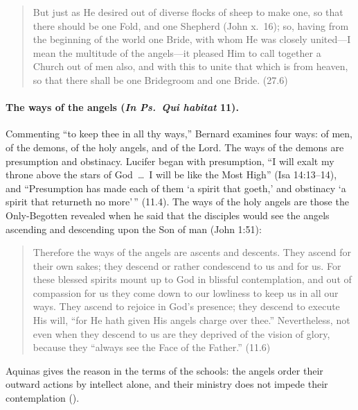 \begin{quote}
But just as He desired out of diverse flocks of sheep to make one, so that
there should be one Fold, and one Shepherd (John x.~16); so, having from the beginning of
the world one Bride, with whom He was closely united---I mean the multitude
of the angels---it pleased Him to call together a Church out of men also,
and with this to unite that which is from heaven, so that there shall be
one Bridegroom and one Bride. (27.6)
\end{quote}

\paragraph{The ways of the angels (\emph{In Ps.\ Qui habitat} 11).}
Commenting ``to keep thee in all thy ways,'' Bernard examines four ways: of
men, of the demons, of the holy angels, and of the Lord. The ways of the
demons are presumption and obstinacy. Lucifer began with presumption, ``I
will exalt my throne above the stars of God~\dots\ I will be like the Most
High'' (Isa 14:13--14), and ``Presumption has made each of them `a spirit
that goeth,' and obstinacy `a spirit that returneth no more'\,'' (11.4). The
ways of the holy angels are those the Only-Begotten revealed when he said
that the disciples would see the angels ascending and descending upon the
Son of man (John 1:51):

\begin{quote}
Therefore the ways of the angels are ascents and descents. They ascend for
their own sakes; they descend or rather condescend to us and for us. For
these blessed spirits mount up to God in blissful contemplation, and out of
compassion for us they come down to our lowliness to keep us in all our
ways. They ascend to rejoice in God's presence; they descend to execute His
will, ``for He hath given His angels charge over thee.'' Nevertheless, not
even when they descend to us are they deprived of the vision of glory,
because they ``always see the Face of the Father.'' (11.6)
\end{quote}

\noindent Aquinas gives the reason in the terms of the schools: the angels
order their outward actions by intellect alone, and their ministry does not
impede their contemplation ().

